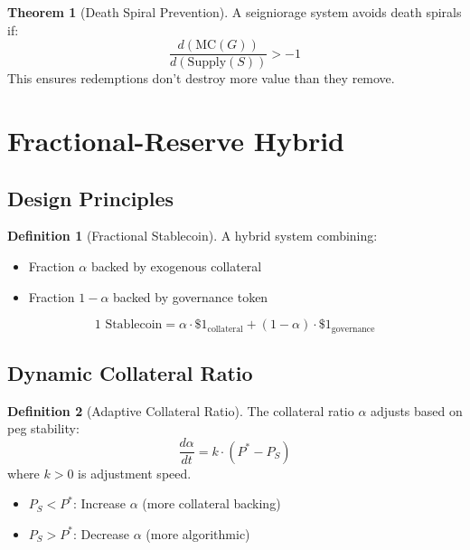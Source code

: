 \documentclass[11pt,a4paper]{article}
\theoremstyle{definition}
\newtheorem{definition}{Definition}
\newtheorem{theorem}{Theorem}
\begin{document}
\begin{theorem}[Death Spiral Prevention]
A seigniorage system avoids death spirals if:
\begin{equation}
\frac{d(\text{MC}(G))}{d(\text{Supply}(S))} > -1
\end{equation}
This ensures redemptions don't destroy more value than they remove.
\end{theorem}

\section{Fractional-Reserve Hybrid}

\subsection{Design Principles}

\begin{definition}[Fractional Stablecoin]
A hybrid system combining:
\begin{itemize}
\item Fraction $\alpha$ backed by exogenous collateral
\item Fraction $1 - \alpha$ backed by governance token
\end{itemize}
\end{definition}

\begin{equation}
1 \text{ Stablecoin} = \alpha \cdot \$1_{\text{collateral}} + (1 - \alpha) \cdot \$1_{\text{governance}}
\end{equation}

\subsection{Dynamic Collateral Ratio}

\begin{definition}[Adaptive Collateral Ratio]
The collateral ratio $\alpha$ adjusts based on peg stability:
\begin{equation}
\frac{d\alpha}{dt} = k \cdot (P^* - P_S)
\end{equation}
where $k > 0$ is adjustment speed.
\end{definition}

\begin{itemize}
\item $P_S < P^*$: Increase $\alpha$ (more collateral backing)
\item $P_S > P^*$: Decrease $\alpha$ (more algorithmic)
\end{itemize}
\end{document}
